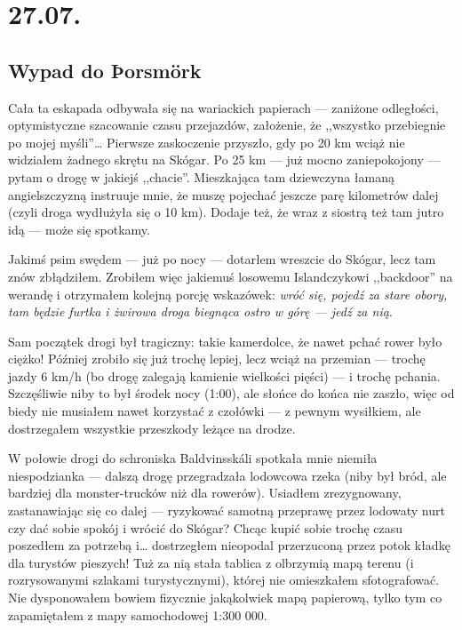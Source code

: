\chapter*{27.07.}

\section*{Wypad do Þorsmörk}


Cała ta eskapada odbywała się na wariackich papierach --- zaniżone odległości, optymistyczne szacowanie czasu przejazdów, założenie, że ,,wszystko przebiegnie po mojej myśli''… Pierwsze zaskoczenie przyszło, gdy po 20 km wciąż nie widziałem żadnego skrętu na Skógar. Po 25 km --- już mocno zaniepokojony --- pytam o drogę w jakiejś ,,chacie''. Mieszkająca tam dziewczyna łamaną angielszczyzną instruuje mnie, że muszę pojechać jeszcze parę kilometrów dalej (czyli droga wydłużyła się o 10 km). Dodaje też, że wraz z siostrą też tam jutro idą --- może się spotkamy.

Jakimś psim swędem --- już po nocy --- dotarłem wreszcie do Skógar, lecz tam znów zbłądziłem. Zrobiłem więc jakiemuś losowemu Islandczykowi ,,backdoor'' na werandę i otrzymałem kolejną porcję wskazówek: \emph{wróć się, pojedź za stare obory, tam będzie furtka i żwirowa droga biegnąca ostro w górę --- jedź za nią}.

Sam początek drogi był tragiczny: takie kamerdolce, że nawet pchać rower było ciężko! Później zrobiło się już trochę lepiej, lecz wciąż na przemian --- trochę jazdy 6 km/h (bo drogę zalegają kamienie wielkości pięści) --- i trochę pchania. Szczęśliwie niby to był środek nocy (1:00), ale słońce do końca nie zaszło, więc od biedy nie musiałem nawet korzystać z czołówki --- z pewnym wysiłkiem, ale dostrzegałem wszystkie przeszkody leżące na drodze.

W połowie drogi do schroniska Baldvinsskáli spotkała mnie niemiła niespodzianka --- dalszą drogę przegradzała lodowcowa rzeka (niby był bród, ale bardziej dla monster-trucków niż dla rowerów). Usiadłem zrezygnowany, zastanawiając się co dalej --- ryzykować samotną przeprawę przez lodowaty nurt czy dać sobie spokój i wrócić do Skógar? Chcąc kupić sobie trochę czasu poszedłem za potrzebą i… dostrzegłem nieopodal przerzuconą przez potok kładkę dla turystów pieszych! Tuż za nią stała tablica z olbrzymią mapą terenu (i rozrysowanymi szlakami turystycznymi), której nie omieszkałem sfotografować. Nie dysponowałem bowiem fizycznie jakąkolwiek mapą papierową, tylko tym co zapamiętałem z mapy samochodowej 1:300 000.

